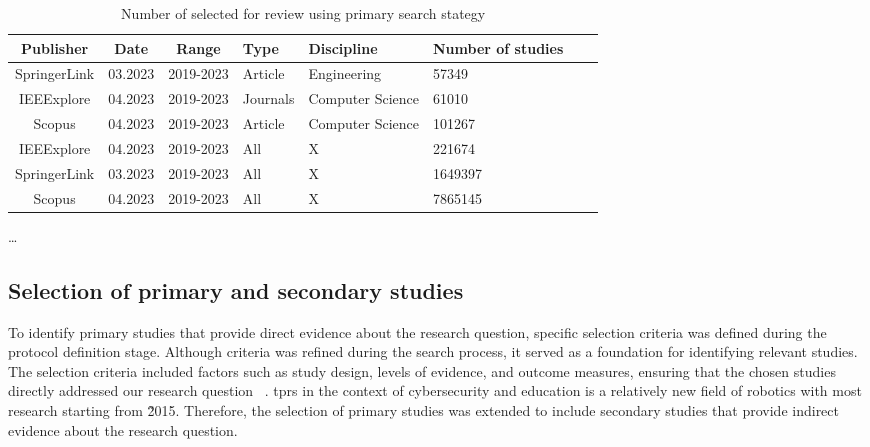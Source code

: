 \begin{table}[htb]
  \centering
  \smaller
  \caption{Number of selected for review using primary search stategy}
  \label{tab:query-results}
  \begin{tabularx}{\textwidth}{|c|c|c|Y|Y|Y|Y|Y|}
    \hline
    \textbf{Publisher} & \textbf{Date} & \textbf{Range} & \textbf{Type} & \textbf{Discipline} & \textbf{Number of studies} \\\hline
    SpringerLink       & 03.2023       & 2019-2023      & Article       & Engineering         & 57349                      \\\hline
    IEEExplore         & 04.2023       & 2019-2023      & Journals      & Computer Science    & 61010                      \\\hline
    Scopus             & 04.2023       & 2019-2023      & Article       & Computer Science    & 101267                     \\\hline
    IEEExplore         & 04.2023       & 2019-2023      & All           & X                   & 221674                     \\\hline
    SpringerLink       & 03.2023       & 2019-2023      & All           & X                   & 1649397                    \\\hline
    Scopus             & 04.2023       & 2019-2023      & All           & X                   & 7865145                    \\\hline
  \end{tabularx}
\end{table}

\ldots

\subsection{Selection of primary and secondary studies}\label{subsec:selection-of-studies}

To identify primary studies that provide direct evidence about the research question, specific selection criteria was defined during the
protocol definition stage. Although criteria was refined during the search process, it served as a foundation for identifying
relevant studies. The selection criteria included factors such as study design, levels of evidence, and outcome measures, ensuring that the
chosen studies directly addressed our research question ~\cite[10-16]{systematic_review_2004}. \ac{tprs} in the context of cybersecurity
and education is a relatively new field of robotics with most research starting from 2̃015. Therefore, the selection of primary
studies was
extended to include secondary studies that provide indirect evidence about the research question.

